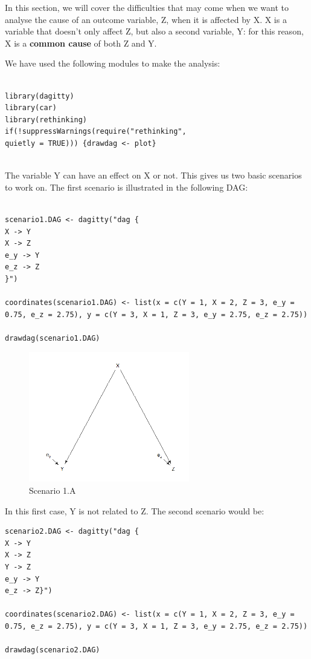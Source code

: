 \documentclass{article}
\begin{document}
In this section, we will cover the difficulties that may come when we want to analyse the cause of an outcome variable, Z, when it is affected by X. X is a variable that doesn't only affect Z, but also a second variable, Y: for this reason, X is a \textbf{common cause} of both Z and Y.\par
We have used the following modules to make the analysis:

\begin{lstlisting}

library(dagitty)
library(car)
library(rethinking)
if(!suppressWarnings(require("rethinking", 
quietly = TRUE))) {drawdag <- plot}
  
\end{lstlisting}

The variable Y can have an effect on X or not. This gives us two basic scenarios to work on. The first scenario is illustrated in the following DAG:

\begin{lstlisting}

scenario1.DAG <- dagitty("dag {
X -> Y
X -> Z
e_y -> Y
e_z -> Z
}")

coordinates(scenario1.DAG) <- list(x = c(Y = 1, X = 2, Z = 3, e_y = 0.75, e_z = 2.75), y = c(Y = 3, X = 1, Z = 3, e_y = 2.75, e_z = 2.75))

drawdag(scenario1.DAG)

\end{lstlisting}

\begin{figure}[h]
\caption{Scenario 1.A}
\includegraphics[width=7cm]{scenario1.DAG.png}
\centering
\end{figure}

In this first case, Y is not related to Z.
The second scenario would be:

\begin{lstlisting}
scenario2.DAG <- dagitty("dag {
X -> Y
X -> Z
Y -> Z
e_y -> Y
e_z -> Z}")

coordinates(scenario2.DAG) <- list(x = c(Y = 1, X = 2, Z = 3, e_y = 0.75, e_z = 2.75), y = c(Y = 3, X = 1, Z = 3, e_y = 2.75, e_z = 2.75))

drawdag(scenario2.DAG)
\end{lstlisting}
\end{document}
